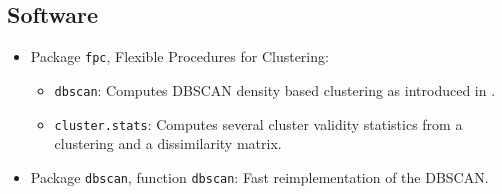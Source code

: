 \subsection{Software}

\begin{itemize}
	\item Package \texttt{fpc}, Flexible Procedures for Clustering:
	      \begin{itemize}
		      \item \texttt{dbscan}: Computes DBSCAN density based clustering as introduced
		            in \cite{ester_density-based_1996}.
		      \item \texttt{cluster.stats}: Computes several cluster validity statistics from a
		            clustering and a dissimilarity matrix.
	      \end{itemize}
	\item Package \texttt{dbscan}, function \texttt{dbscan}: Fast reimplementation of the
	      DBSCAN.
\end{itemize}
